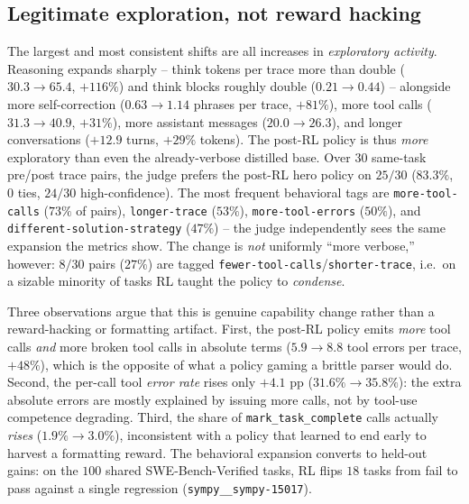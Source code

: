 \documentclass{article}
\begin{document}
\subsection{Legitimate exploration, not reward hacking}
\label{app:rl-behavior-hero}



The largest and most consistent shifts are all increases in \emph{exploratory activity}. Reasoning expands sharply -- think tokens per trace more than double ($30.3\!\to\!65.4$, $+116\%$) and think blocks roughly double ($0.21\!\to\!0.44$) -- alongside more self-correction ($0.63\!\to\!1.14$ phrases per trace, $+81\%$), more tool calls ($31.3\!\to\!40.9$, $+31\%$), more assistant messages ($20.0\!\to\!26.3$), and longer conversations ($+12.9$ turns, $+29\%$ tokens). The post-RL policy is thus \emph{more} exploratory than even the already-verbose distilled base. Over $30$ same-task pre/post trace pairs, the judge prefers the post-RL hero policy on $25/30$ ($83.3\%$, $0$ ties, $24/30$ high-confidence). The most frequent behavioral tags are \texttt{more-tool-calls} ($73\%$ of pairs), \texttt{longer-trace} ($53\%$), \texttt{more-tool-errors} ($50\%$), and \texttt{different-solution-strategy} ($47\%$) -- the judge independently sees the same expansion the metrics show. The change is \emph{not} uniformly ``more verbose,'' however: $8/30$ pairs ($27\%$) are tagged \texttt{fewer-tool-calls}/\texttt{shorter-trace}, i.e.\ on a sizable minority of tasks RL taught the policy to \emph{condense}.

Three observations argue that this is genuine capability change rather than a reward-hacking or formatting artifact. First, the post-RL policy emits \emph{more} tool calls \emph{and} more broken tool calls in absolute terms ($5.9\!\to\!8.8$ tool errors per trace, $+48\%$), which is the opposite of what a policy gaming a brittle parser would do. Second, the per-call tool \emph{error rate} rises only $+4.1$ pp ($31.6\%\!\to\!35.8\%$): the extra absolute errors are mostly explained by issuing more calls, not by tool-use competence degrading. Third, the share of \texttt{mark\_task\_complete} calls actually \emph{rises} ($1.9\%\!\to\!3.0\%$), inconsistent with a policy that learned to end early to harvest a formatting reward. The behavioral expansion converts to held-out gains: on the $100$ shared SWE-Bench-Verified tasks, RL flips $18$ tasks from fail to pass against a single regression (\texttt{sympy\_\_sympy-15017}).
\end{document}

